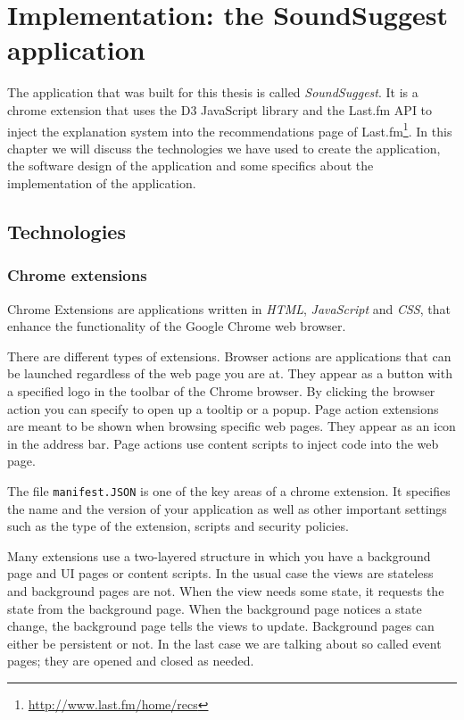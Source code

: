 \chapter{Implementation: the SoundSuggest application}\label{chapter:implementation}

The application that was built for this thesis is called \emph{SoundSuggest}. It is a chrome extension that uses the D3 JavaScript library and the Last.fm API to inject the explanation system into the recommendations page of Last.fm\footnote{\url{http://www.last.fm/home/recs}}. In this chapter we will discuss the technologies we have used to create the application, the software design of the application and some specifics about the implementation of the application.


\section{Technologies}\label{chapter:implementation:section:technologies}

\subsection{Chrome extensions}\label{chapter:implementation:section:technologies:subsection:chrome}

Chrome Extensions are applications written in \emph{HTML}, \emph{JavaScript} and \emph{CSS}, that enhance the functionality of the Google Chrome web browser\cite{google:2012:extensions}.

There are different types of extensions. Browser actions are applications that can be launched regardless of the web page you are at. They appear as a button with a specified logo in the toolbar of the Chrome browser. By clicking the browser action you can specify to open up a tooltip or a popup\cite{google:2012:browseraction}. Page action extensions are meant to be shown when browsing specific web pages. They appear as an icon in the address bar. Page actions use content scripts to inject code into the web page\cite{google:2012:overview}.

The file \texttt{manifest.JSON} is one of the key areas of a chrome extension. It specifies the name and the version of your application as well as other important settings such as the type of the extension, scripts and security policies\cite{google:2012:manifest}.

Many extensions use a two-layered structure in which you have a background page and UI pages or content scripts\cite{google:2012:overview}. In the usual case the views are stateless and background pages are not. When the view needs some state, it requests the state from the background page. When the background page notices a state change, the background page tells the views to update\cite{google:2012:background}. Background pages can either be persistent or not. In the last case we are talking about so called event pages; they are opened and closed as needed\cite{google:2012:overview}.

